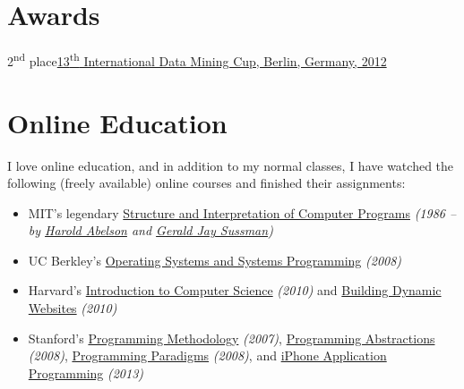 \documentclass{tccv}
\begin{document}
{{\begin{project_list}
\end{project_list}




\vspace{-30pt}




\section{Awards}

\begin{factlist}
\item{2\textsuperscript{nd} place}{\href{http://www.data-mining-cup.de/en/review/dmc-2012/}{13\textsuperscript{th} International Data Mining Cup, Berlin, Germany, 2012}}
\end{factlist}




\vspace{300px}


\section{Online Education}

I love online education, and in addition to my normal classes, I have watched the following (freely available) online courses and finished their assignments:

\begin{itemize}

\item MIT's legendary \href{http://groups.csail.mit.edu/mac/classes/6.001/abelson-sussman-lectures/}{Structure and Interpretation of Computer Programs} {\it(1986 -- by \href{https://en.wikipedia.org/wiki/Hal_Abelson}{Harold Abelson} and \href{https://en.wikipedia.org/wiki/Gerald_Jay_Sussman}{Gerald Jay Sussman})}

\item UC Berkley's \href{http://www.cs.berkeley.edu/~kubitron/courses/cs162-F08/}{Operating Systems and Systems Programming} {\it(2008)}

\item Harvard's \href{http://cs50.tv/2010/fall/}{Introduction to Computer Science} {\it(2010)} and \href{http://cs75.tv/2010/fall/}{Building Dynamic Websites} {\it(2010)}

\item Stanford's \href{http://see.stanford.edu/see/courseinfo.aspx?coll=824a47e1-135f-4508-a5aa-866adcae1111}{Programming Methodology} {\it(2007)}, \href{http://see.stanford.edu/see/courseinfo.aspx?coll=11f4f422-5670-4b4c-889c-008262e09e4e}{Programming Abstractions} {\it(2008)}, \href{http://see.stanford.edu/see/courseinfo.aspx?coll=2d712634-2bf1-4b55-9a3a-ca9d470755ee}{Programming Paradigms} {\it(2008)}, and \href{http://www.stanford.edu/class/cs193p}{iPhone Application Programming} {\it(2013)}
	

\end{itemize}}}
\end{document}
